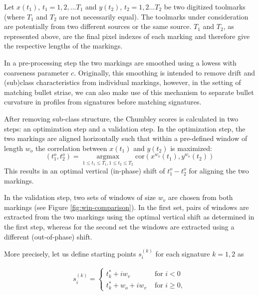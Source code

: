 \documentclass[12pt]{article}
\begin{document}
Let \(x(t_1)\), \(t_1 = 1,2,...T_1\) and \(y(t_2)\), \(t_2 = 1,2...T_2\)
be two digitized toolmarks (where \(T_1\) and \(T_2\) are not
necessarily equal). The toolmarks under consideration are potentially
from two different sources or the same source. \(T_1\) and \(T_2\), as
represented above, are the final pixel indexes of each marking and
therefore give the respective lengths of the markings.

In a pre-processing step the two markings are smoothed using a lowess
\citep{lowess} with coarseness parameter \(c\). Originally, this
smoothing is intended to remove drift and (sub)class characteristics
from individual markings, however, in the setting of matching bullet
striae, we can also make use of this mechanism to separate bullet
curvature in profiles from signatures before matching signatures.

After removing sub-class structure, the Chumbley scores is calculated in
two steps: an optimization step and a validation step. In the
optimization step, the two markings are aligned horizontally such that
within a pre-defined window of length \(w_o\) the correlation between
\(x(t_1)\) and \(y(t_2)\) is maximized: \[
\left(t_1^o, t_2^o\right) = \mathop{\arg \max}\limits_{1 \le t_1 \le T_1, 1 \le t_2 \le T_2} \text{cor} \left(x^{w_o} (t_1), y^{w_o}(t_2) \right)
\] This results in an optimal vertical (in-phase) shift of
\(t_1^o - t_2^o\) for aligning the two markings.

In the validation step, two sets of windows of size \(w_v\) are chosen
from both markings (see Figure \ref{fig:win-comparison}). In the first
set, pairs of windows are extracted from the two markings using the
optimal vertical shift as determined in the first step, whereas for the
second set the windows are extracted using a different (out-of-phase)
shift.

More precisely, let us define starting points \(s_i^{(k)}\) for each
signature \(k = 1, 2\) as

\begin{eqnarray}\label{eq.start}
s^{(k)}_i = 
\begin{cases}
t_k^* + i w_v & \text{ for } i < 0 \\
t_k^* + w_ o + i w_v & \text{ for } i \ge 0,
\end{cases}
\end{eqnarray}
\end{document}

